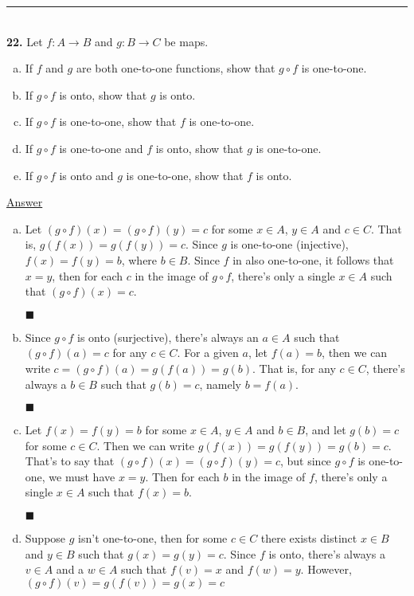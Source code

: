 \documentclass{article}[10pt]
\newenvironment{exercise}[1]
    {\noindent\rule{2cm}{0.4pt} \\
     \textbf{#1.}}
    {}
\newcommand{\answer}{

  \underline{Answer}

}
\newcommand{\qed}{

\hfill\ensuremath{\blacksquare}

}
\begin{document}
\begin{exercise}{22}
  Let $f : A \to B$ and $g : B \to C$ be maps.
  \begin{enumerate}[(a)]
    \item If $f$ and $g$ are both one-to-one functions,
          show that $g \circ f$ is one-to-one.
    \item If $g \circ f$ is onto, show that $g$ is onto.
    \item If $g \circ f$ is one-to-one, show that $f$ is one-to-one.
    \item If $g \circ f$ is one-to-one and $f$ is onto,
          show that $g$ is one-to-one.
    \item If $g \circ f$ is onto and $g$ is one-to-one,
          show that $f$ is onto.
  \end{enumerate}
  \answer
  \begin{enumerate}[(a)]
    \item
      Let $(g \circ f)(x) = (g \circ f)(y) = c$
      for some $x \in A$, $y \in A$ and $c \in C$.
      That is, $g(f(x)) = g(f(y)) = c$.
      Since $g$ is one-to-one (injective),
      $f(x) = f(y) = b$, where $b \in B$.
      Since $f$ in also one-to-one, it follows that $x = y$,
      then for each $c$ in the image of $g \circ f$,
      there's only a single $x \in A$ such that
      $(g \circ f)(x) = c$.
      \qed
    \item
      Since $g \circ f$ is onto (surjective),
      there's always an $a \in A$
      such that $(g \circ f)(a) = c$
      for any $c \in C$.
      For a given $a$, let $f(a) = b$,
      then we can write $c = (g \circ f)(a) = g(f(a)) = g(b)$.
      That is, for any $c \in C$, there's always a $b \in B$
      such that $g(b) = c$, namely $b = f(a)$.
      \qed
    \item
      Let $f(x) = f(y) = b$
      for some $x \in A$, $y \in A$ and $b \in B$,
      and let $g(b) = c$ for some $c \in C$.
      Then we can write $g(f(x)) = g(f(y)) = g(b) = c$.
      That's to say that $(g \circ f)(x) = (g \circ f)(y) = c$,
      but since $g \circ f$ is one-to-one, we must have $x = y$.
      Then for each $b$ in the image of $f$,
      there's only a single $x \in A$ such that $f(x) = b$.
      \qed
    \item
      Suppose $g$ isn't one-to-one, then for some $c \in C$
      there exists distinct $x \in B$ and $y \in B$
      such that $g(x) = g(y) = c$.
      Since $f$ is onto, there's always a $v \in A$ and a $w \in A$
      such that $f(v) = x$ and $f(w) = y$.
      However, $(g \circ f)(v) = g(f(v)) = g(x) = c$

\end{enumerate}
\end{exercise}
\end{document}
